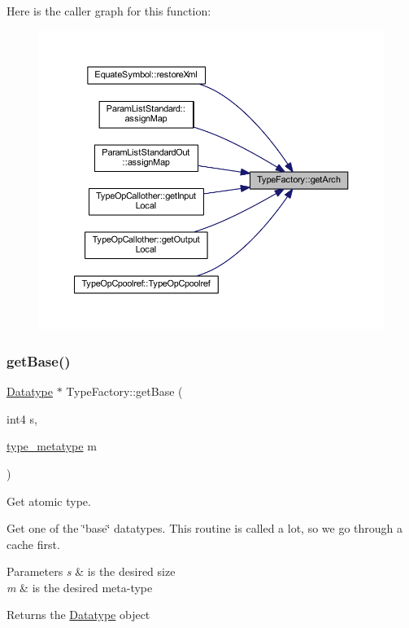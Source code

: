Here is the caller graph for this function\+:
\nopagebreak
\begin{figure}[H]
\begin{center}
\leavevmode
\includegraphics[width=350pt]{class_type_factory_a216789e9300282a12e6bf22a4354ba6e_icgraph}
\end{center}
\end{figure}
\mbox{\label{class_type_factory_a5fe1ae26c0b76b18d59d5cd27a9b8ff1}} 
\subsubsection{\texorpdfstring{getBase()}{getBase()}\hspace{0.1cm}{\footnotesize\ttfamily [1/2]}}
{\footnotesize\ttfamily \mbox{\hyperlink{class_datatype}{Datatype}} $\ast$ Type\+Factory\+::get\+Base (\begin{DoxyParamCaption}\item[{int4}]{s,  }\item[{\mbox{\hyperlink{type_8hh_aef6429f2523cdf4d415ba04a0209e61f}{type\+\_\+metatype}}}]{m }\end{DoxyParamCaption})}



Get atomic type. 

Get one of the \char`\"{}base\char`\"{} datatypes. This routine is called a lot, so we go through a cache first. 
\begin{DoxyParams}{Parameters}
{\em s} & is the desired size \\
\hline
{\em m} & is the desired meta-\/type \\
\hline
\end{DoxyParams}
\begin{DoxyReturn}{Returns}
the \mbox{\hyperlink{class_datatype}{Datatype}} object 
\end{DoxyReturn}


